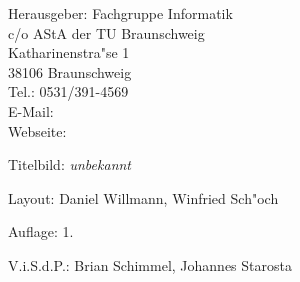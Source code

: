 
\begin{nimpressum}
\item[Herausgeber:]
	Fachgruppe Informatik\\
	c/o AStA der TU Braunschweig\\
	Katharinenstra"se 1\\
	38106 Braunschweig\\
	Tel.: 0531/391-4569\\
	E-Mail: \\
	Webseite: 
\item[Titelbild:]
	\textit{unbekannt}
\item[Layout:]
	Daniel Willmann, Winfried Sch"och

%
\item[Auflage:]
  1.
\item[V.i.S.d.P.:]  %
  Brian Schimmel, Johannes Starosta
\end{nimpressum}

